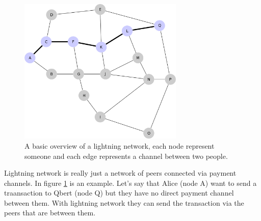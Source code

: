 \begin{figure}[H]
	\centering
	\includegraphics[width=0.70\textwidth]{introduction/images/mesh_network.png}
	\caption{A basic overview of a lightning network, each node represent someone
	and each edge represents a channel between two people.}
	\label{fig:mesh}
\end{figure}

Lightning network is really just a network of peers connected via payment channels. In figure \ref{fig:mesh} is an example. Let's say that Alice (node A) want to send a traansaction to Qbert (node Q) but they have no direct payment channel between them. With lightning network they can send the transaction via the peers that are between them. 